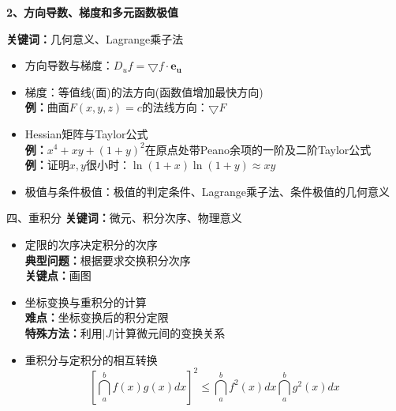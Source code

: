 \begin{frame}
	\linespread{1.2}
	{\bf 2、方向导数、梯度和多元函数极值}\pause 
	
	{\b{\bf 关键词：}\pause 几何意义、\pause Lagrange乘子法}\pause 
	\begin{itemize}
	  \item 方向导数与梯度：\pause $D_uf=\bigtriangledown f\cdot\bm{e_u}$\pause 
	  \item 梯度：\pause 等值线(面)的法方向\pause (函数值增加最快方向)\pause \\
	  {\bf 例：}曲面$F(x,y,z)=c$的法线方向：$\bigtriangledown F$\pause 
	  \item Hessian矩阵与Taylor公式\pause \\
	  {\bf 例：}$x^4+xy+(1+y)^2$在原点处带Peano余项的一阶及二阶Taylor公式\pause \\
	  {\bf 例：}证明$x,y$很小时：$\ln(1+x)\ln(1+y)\approx xy$\pause 
	  \item 极值与条件极值：\pause 极值的判定条件、\pause Lagrange乘子法、\pause 条件极值的几何意义
	\end{itemize}
\end{frame}

\begin{frame}{四、重积分}
	\linespread{1.2}\pause 
	{\b{\bf 关键词：}\pause 微元、\pause 积分次序、\pause 物理意义}\pause 
	\begin{itemize}
	  \item 定限的次序决定积分的次序\pause \\
	  {\bf 典型问题：}根据要求交换积分次序\pause \\
	  {\bf 关键点：\pause }画图\pause 
	  \item 坐标变换与重积分的计算\pause \\
	  {\bf 难点：}坐标变换后的积分定限\pause \\
	  {\bf 特殊方法：}利用$|J|$计算微元间的变换关系\pause 
	  \item 重积分与定积分的相互转换\pause 
	  $$\left[\dint_a^bf(x)g(x)dx\right]^2\leq
		\dint_a^bf^2(x)dx\dint_a^bg^2(x)dx$$
	\end{itemize}
\end{frame}

